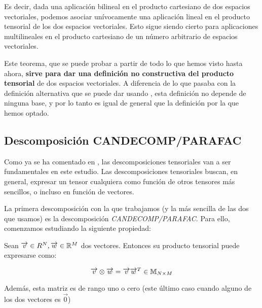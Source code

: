 Es decir, dada una aplicación bilineal en el producto cartesiano de dos espacios vectoriales, podemos asociar unívocamente una aplicación lineal en el producto tensorial de los dos espacios vectoriales. Esto sigue siendo cierto para aplicaciones multilineales en el producto cartesiano de un número arbitrario de espacios vectoriales.

Este teorema, que se puede probar a partir de todo lo que hemos visto hasta ahora, \textbf{sirve para dar una definición no constructiva del producto tensorial} de dos espacios vectoriales. A diferencia de lo que pasaba con la definición alternativa que se puede dar usando , esta definición no depende de ninguna base, y por lo tanto es igual de general que la definición por la que hemos optado.

\subsection{Descomposición CANDECOMP/PARAFAC}

Como ya se ha comentado en , las descomposiciones tensoriales van a ser fundamentales en este estudio. Las descomposiciones tensoriales buscan, en general, expresar un tensor cualquiera como función de otros tensores más sencillos, o incluso en función de vectores.

La primera descomposición con la que trabajamos (y la más sencilla de las dos que usamos) es la descomposición \textit{CANDECOMP/PARAFAC}. Para ello, comenzamos estudiando la siguiente propiedad:

\begin{proposicion}
    Sean $\overrightarrow{v} \in R^{N}, \overrightarrow{w} \in \mathbb{R}^{M}$ dos vectores. Entonces su producto tensorial puede expresarse como:

    $$\overrightarrow{v} \otimes \overrightarrow{w} = \overrightarrow{v} \overrightarrow{w}^T \in \mathbb{M}_{N \times M}$$

    Además, esta matriz es de rango uno o cero (este último caso cuando alguno de los dos vectores es $\vec{0}$)
\end{proposicion}

